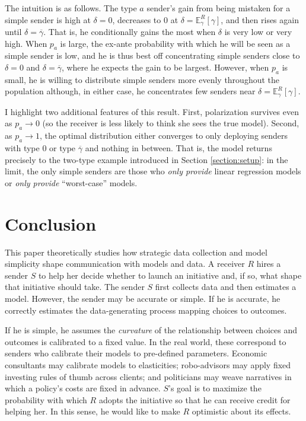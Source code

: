 \documentclass[11pt,dvipsnames]{article}
\begin{document}
The intuition is as follows.
The type $a$ sender's gain from being mistaken for a simple sender is high at $\delta = 0$, decreases to $0$ at $\delta = \mathbb{E}_\gamma^R[\gamma]$, and then rises again until $\delta = \overline{\gamma}$.
That is, he conditionally gains the most when $\delta$ is very low or very high.
When $p_a$ is large, the ex-ante probability with which he will be seen as a simple sender is low, and he is thus best off concentrating simple senders close to $\delta=0$ and $\delta = \overline{\gamma}$, where he expects the gain to be largest.
However, when $p_a$ is small, he is willing to distribute simple senders more evenly throughout the population although, in either case, he concentrates few senders near $\delta = \mathbb{E}_\gamma^R[\gamma]$.

I highlight two additional features of this result.
First, polarization survives even as $p_a \to 0$ (so the receiver is less likely to think she sees the true model).
Second, as $p_a \to 1$, the optimal distribution either converges to only deploying senders with type $0$ or type $\overline{\gamma}$ and nothing in between.
That is, the model returns precisely to the two-type example introduced in Section \ref{section:setup}: in the limit, the only simple senders are those who \emph{only provide} linear regression models or \emph{only provide} ``worst-case'' models.


\section{Conclusion}\label{section:conclusion}
This paper theoretically studies how strategic data collection and model simplicity shape communication with models and data.
A receiver $R$ hires a sender $S$ to help her decide whether to launch an initiative and, if so, what shape that initiative should take.
The sender $S$ first collects data and then estimates a model.
However, the sender may be accurate or simple.
If he is accurate, he correctly estimates the data-generating process mapping choices to outcomes.

If he is simple, he assumes the \emph{curvature} of the relationship between choices and outcomes is calibrated to a fixed value.
In the real world, these correspond to senders who calibrate their models to pre-defined parameters. Economic consultants may calibrate models to elasticities; robo-advisors may apply fixed investing rules of thumb across clients; and politicians may weave narratives in which a policy's costs are fixed in advance.
$S$'s goal is to maximize the probability with which $R$ adopts the initiative so that he can receive credit for helping her.
In this sense, he would like to make $R$ optimistic about its effects.
\end{document}
